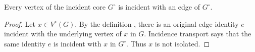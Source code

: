 \begin{lemma}
Every vertex of the incident core $G^{\circ}$ is incident with an edge of
$G^{\circ}$.
\end{lemma}
\begin{proof}
Let $x\in V^{\circ}(G)$.  By the definition
, there is an original edge identity $e$ incident
with the underlying vertex of $x$ in $G$.  Incidence transport
 says that the same identity $e$ is incident
with $x$ in $G^{\circ}$.  Thus $x$ is not isolated.
\end{proof}

